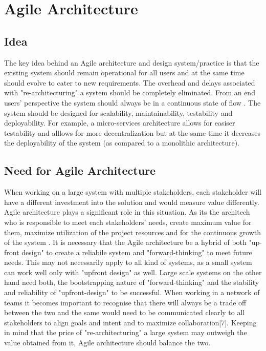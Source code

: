 \documentclass[sigplan,screen]{acmart}
\begin{document}
\section{Agile Architecture}
\subsection{Idea}
The key idea behind an Agile architecture and design system/practice is that the existing system should remain operational for all users and at the same time should evolve to cater to new requirements.
The overhead and delays associated with "re-architecturing" a system should be completely eliminated. From an end users' perspective the system should always be in a continuous state of flow \cite{b5}.
The system should be designed for scalability, maintainability, testability and deployability. For example, a micro-services architecture allows for easiser testability and alllows for more decentralization but at the same time it decreases the deployability of the system (as compared to a monolithic architecture).
\subsection{Need for Agile Architecture}
When working on a large system with multiple stakeholders, each stakeholder will have a different investment into the solution and would measure value differently.
Agile architecture plays a significant role in this situation. As its the architech who is responsible to meet each stakeholders' needs, create maximum value for them, maximize utilization of the project resources and for the continuous growth of the system \cite{b6}.
It is necessary that the Agile architecture be a hybrid of both "up-front design" to create a reliabile system and "forward-thinking" to meet future needs. This may not necessarily apply to all kind of systems, as a small system can work well only with "upfront design" as well.
Large scale systems on the other hand need both, the bootstrapping nature of "forward-thinking" and the stability and reliability of "upfront-design" to be successful. When working in a network of teams it becomes important to recognise that there will always be a trade off between the two and the same would need to be communicated clearly to all stakeholders to align goals and intent and to maximize collaboration[7].
Keeping in mind that the price of "re-architecturing" a large system may outweigh the value obtained from it, Agile architecture should balance the two.
\end{document}
